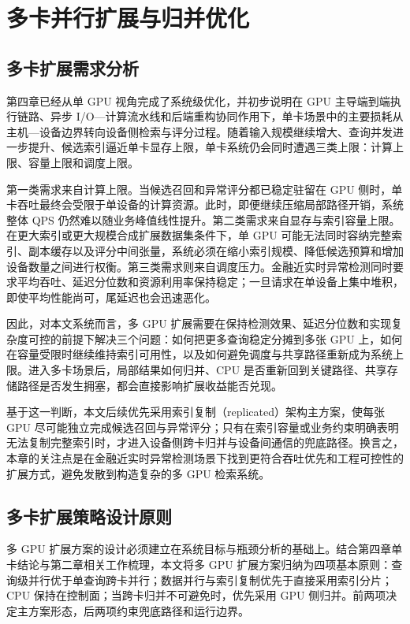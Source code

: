 
\chapter{多卡并行扩展与归并优化}

\section{多卡扩展需求分析}

第四章已经从单 GPU 视角完成了系统级优化，并初步说明在 GPU 主导端到端执行链路、异步 I/O---计算流水线和后端重构协同作用下，单卡场景中的主要损耗从主机---设备边界转向设备侧检索与评分过程。随着输入规模继续增大、查询并发进一步提升、候选索引逼近单卡显存上限，单卡系统仍会同时遭遇三类上限：计算上限、容量上限和调度上限。

第一类需求来自计算上限。当候选召回和异常评分都已稳定驻留在 GPU 侧时，单卡吞吐最终会受限于单设备的计算资源。此时，即便继续压缩局部路径开销，系统整体 QPS 仍然难以随业务峰值线性提升。第二类需求来自显存与索引容量上限。在更大索引或更大规模合成扩展数据集条件下，单 GPU 可能无法同时容纳完整索引、副本缓存以及评分中间张量，系统必须在缩小索引规模、降低候选预算和增加设备数量之间进行权衡\citep{cuvs_multi_gpu_nn,cuvs_multi_gpu_ivf_host}。第三类需求则来自调度压力。金融近实时异常检测同时要求平均吞吐、延迟分位数和资源利用率保持稳定；一旦请求在单设备上集中堆积，即使平均性能尚可，尾延迟也会迅速恶化。

因此，对本文系统而言，多 GPU 扩展需要在保持检测效果、延迟分位数和实现复杂度可控的前提下解决三个问题：如何把更多查询稳定分摊到多张 GPU 上，如何在容量受限时继续维持索引可用性，以及如何避免调度与共享路径重新成为系统上限\citep{cuvs_multi_gpu_nn}。进入多卡场景后，局部结果如何归并、CPU 是否重新回到关键路径、共享存储路径是否发生拥塞，都会直接影响扩展收益能否兑现。

基于这一判断，本文后续优先采用索引复制（replicated）架构主方案，使每张 GPU 尽可能独立完成候选召回与异常评分；只有在索引容量或业务约束明确表明无法复制完整索引时，才进入设备侧跨卡归并与设备间通信的兜底路径。换言之，本章的关注点是在金融近实时异常检测场景下找到更符合吞吐优先和工程可控性的扩展方式，避免发散到构造复杂的多 GPU 检索系统。

\section{多卡扩展策略设计原则}

多 GPU 扩展方案的设计必须建立在系统目标与瓶颈分析的基础上。结合第四章单卡结论与第二章相关工作梳理，本文将多 GPU 扩展方案归纳为四项基本原则：查询级并行优于单查询跨卡并行；数据并行与索引复制优先于直接采用索引分片；CPU 保持在控制面；当跨卡归并不可避免时，优先采用 GPU 侧归并。前两项决定主方案形态，后两项约束兜底路径和运行边界。

